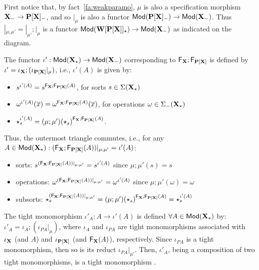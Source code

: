 \begin{PROOF}
First notice that, by fact~\ref{fa:weakparamo}, $\mu$ is also a
specification morphism ${\bf X}_-\to {\bf P[X]_-}$, and so $|_\mu$ is
also a functor ${\sf {Mod}}({\bf P[X]_-})\to {\sf {Mod}}({\bf X_-})$. Thus
$|_{\mu;\mu'}=|_{\mu'};|_\mu$ is a functor
${\sf {Mod}}({\bf W[P[X]]_\star})\to{\sf {Mod}}({\bf X_-})$ as indicated on the
diagram.

The functor $\iota':{\sf {Mod}}({\bf X_\star})\to{\sf {Mod}}({\bf X_-})$
corresponding to ${\sf {F_{\bf X}}};{\sf {F_{\bf P[X]}}}$ is defined by
$\iota' = \iota_{{\bf X}};(\iota_{{\bf P[X]}}|_\mu)$, i.e., 
$\iota'(A)$ is given by:
\begin{itemize}\MyLPar
\item $s^{\iota'(A)} = s^{{\sf {F_{\bf X}}};{\sf {F_{\bf P[X]}}}(A)}$, for
sorts $s \in \Sigma({\bf X_\star})$ 
\item $\omega^{\iota'(A)}(\overline{x})=
\omega^{{\sf {F_{\bf X}}};{\sf {F_{\bf P[X]}}}(A)}(\overline{x})$, for
operations $\omega \in \Sigma_-({\bf X_\star})$  
\item $\star_s^{\iota'(A)} =
{(\mu;\mu')(\star_s)}^{{\sf {F_{\bf X}}};{\sf {F_{\bf P[X]}}}(A)}$.  
\end{itemize}
Thus, the outermost triangle commutes, i.e.,
for any $A\in{\sf {Mod}}({\bf X_\star}): ({{\sf {F_{\bf X}}};{\sf {F_{\bf P[X]}}}(A)})|_{\mu;\mu'} =
	\iota'(A)$: 
\begin{itemize}\MyLPar
\item sorts:
$s^{({{\sf {F_{\bf X}}};{\sf {F_{\bf P[X]}}}(A)})|_{\mu;\mu'}} = s^{\iota'(A)}$ since ${\mu;\mu'}(s) = s$
\item operations:
$\omega^{({{\sf {F_{\bf X}}};{\sf {F_{\bf P[X]}}}(A)})|_{\mu;\mu'}} =
\omega^{\iota'(A)}$ since ${\mu;\mu'}(\omega) = \omega$ 
\item subsorts:
$\star_s^{({{\sf {F_{\bf X}}};{\sf {F_{\bf P[X]}}}(A)})|_{\mu;\mu'}} =
{(\mu;\mu')(\star_s)}^{{\sf {F_{\bf X}}};{\sf {F_{\bf P[X]}}}(A)} =
\star_s^{\iota'(A)}$
\end{itemize}
The tight monomorphism $\iota'_A: A \to \iota'(A)$ is
defined $\forall A\in{\sf {Mod}}({\bf X_\star})$ by: 
$\iota'_{A} = \iota_A; (\iota_{PA}|_\mu)$, 
where $\iota_A$ and
$\iota_{PA}$ are tight monomorphisms associated with $\iota_{{\bf X}}$ (and $A$) and
$\iota_{{\bf P[X]}}$ (and ${\sf {F}}_{{\bf X}}(A)$), respectively. 
Since $\iota_{PA}$ is a tight monomorphism, then so is its reduct $\iota_{PA}|_{\mu'}$. Then,
$\iota'_A$, being a composition of two tight monomorphisms, is a tight
monomorphism \cite{catrel}. 


\end{PROOF}

